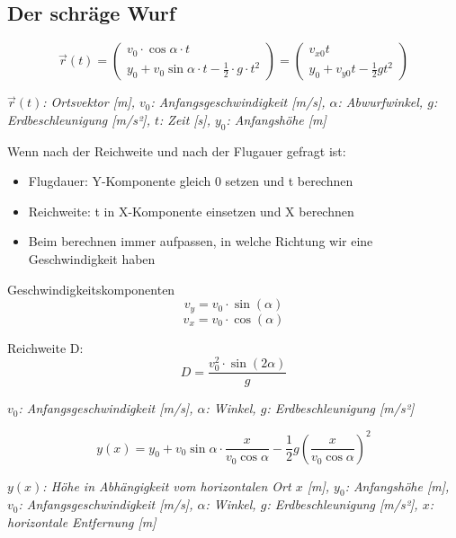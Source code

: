 \documentclass[a4paper,10pt]{article}
\newenvironment{displayformula}
{
	\begin{framed}
		\color{formulaColor}
	}
	{\end{framed}}
\newcommand{\formulalegend}[1]{%
	\par\vspace{0.5ex}%
	{{\color{legendColor}\RaggedRight\small\textit{#1}}}%
	\par\vspace{1.5ex}%
}
\begin{document}
\subsection{Der schräge Wurf}

\begin{displayformula}
	\[
	\vec{r}(t) =
	\begin{pmatrix}
		v_0 \cdot \cos\alpha \cdot t\\
		y_0 + v_0\sin\alpha \cdot t - \frac{1}{2} \cdot g \cdot t^2
	\end{pmatrix}
	=
	\begin{pmatrix}
		v_{x0} t\\
		y_0 + v_{y0} t - \frac{1}{2} g t^2
	\end{pmatrix}
	\]
\end{displayformula}
\formulalegend{
	\( \vec{r}(t) \): Ortsvektor [m], \( v_0 \): Anfangsgeschwindigkeit [m/s], \( \alpha \): Abwurfwinkel, \( g \): Erdbeschleunigung [m/s²], \( t \): Zeit [s], \( y_0 \): Anfangshöhe [m]
}
	Wenn nach der Reichweite und nach der Flugauer gefragt ist:
\begin{itemize}

	\item Flugdauer: Y-Komponente gleich 0 setzen und t berechnen
	\item Reichweite: t in X-Komponente einsetzen und X berechnen
	\item Beim berechnen immer aufpassen, in welche Richtung wir eine Geschwindigkeit haben
\end{itemize}

\begin{displayformula}
	Geschwindigkeitskomponenten
	\[
	v_y = v_0 \cdot \sin (\alpha)
	\]
	\[
	v_x = v_0 \cdot \cos (\alpha)
	\]
\end{displayformula}

\begin{displayformula}
	Reichweite D:
	\[
	D = \frac{v_0^2 \cdot \sin (2 \alpha)}{g}
	\]
\end{displayformula}


\formulalegend{
\( v_0 \): Anfangsgeschwindigkeit [m/s], \( \alpha \): Winkel, \( g \): Erdbeschleunigung [m/s²]
}

\begin{displayformula}
	\[
	y(x) = y_0 + v_0\sin\alpha \cdot \frac{x}{v_0 \cos\alpha} - \frac{1}{2} g \left(\frac{x}{v_0\cos\alpha}\right)^2
	\]
\end{displayformula}
\formulalegend{
	\( y(x) \): Höhe in Abhängigkeit vom horizontalen Ort \( x \) [m], \( y_0 \): Anfangshöhe [m], \( v_0 \): Anfangsgeschwindigkeit [m/s], \( \alpha \): Winkel, \( g \): Erdbeschleunigung [m/s²], \( x \): horizontale Entfernung [m]
}
\end{document}
